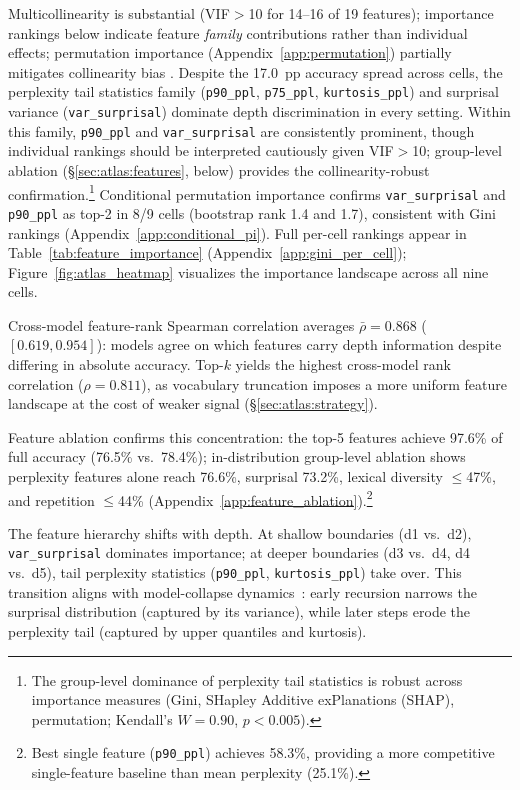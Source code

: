 Multicollinearity is substantial (VIF${>}$10 for 14--16 of 19 features); importance rankings below indicate feature \emph{family} contributions rather than individual effects; permutation importance (Appendix~\ref{app:permutation}) partially mitigates collinearity bias \cite{strobl2008_conditional,hooker2021_permutation}.
Despite the 17.0~pp accuracy spread across cells, the perplexity tail statistics family (\texttt{p90\_ppl}, \texttt{p75\_ppl}, \texttt{kurtosis\_ppl}) and surprisal variance (\texttt{var\_surprisal}) dominate depth discrimination in every setting.
Within this family, \texttt{p90\_ppl} and \texttt{var\_surprisal} are consistently prominent, though individual rankings should be interpreted cautiously given VIF${>}$10; group-level ablation (\S\ref{sec:atlas:features}, below) provides the collinearity-robust confirmation.\footnote{The group-level dominance of perplexity tail statistics is robust across importance measures (Gini, SHapley Additive exPlanations (SHAP), permutation; Kendall's $W{=}0.90$, $p{<}0.005$).}
Conditional permutation importance \citep{strobl2008_conditional} confirms \texttt{var\_surprisal} and \texttt{p90\_ppl} as top-2 in 8/9 cells (bootstrap rank 1.4 and 1.7), consistent with Gini rankings (Appendix~\ref{app:conditional_pi}).
Full per-cell rankings appear in Table~\ref{tab:feature_importance} (Appendix~\ref{app:gini_per_cell}); Figure~\ref{fig:atlas_heatmap} visualizes the importance landscape across all nine cells.

Cross-model feature-rank Spearman correlation averages $\bar{\rho} = 0.868$ ($[0.619, 0.954]$): models agree on which features carry depth information despite differing in absolute accuracy.
Top-$k$ yields the highest cross-model rank correlation ($\rho = 0.811$), as vocabulary truncation imposes a more uniform feature landscape at the cost of weaker signal (\S\ref{sec:atlas:strategy}).

Feature ablation confirms this concentration: the top-5 features achieve 97.6\% of full accuracy (76.5\% vs.\ 78.4\%); in-distribution group-level ablation shows perplexity features alone reach 76.6\%, surprisal 73.2\%, lexical diversity ${\leq}$47\%, and repetition ${\leq}$44\% (Appendix~\ref{app:feature_ablation}).\footnote{Best single feature (\texttt{p90\_ppl}) achieves 58.3\%, providing a more competitive single-feature baseline than mean perplexity (25.1\%).}

The feature hierarchy shifts with depth.
At shallow boundaries (d1 vs.\ d2), \texttt{var\_surprisal} dominates importance; at deeper boundaries (d3 vs.\ d4, d4 vs.\ d5), tail perplexity statistics (\texttt{p90\_ppl}, \texttt{kurtosis\_ppl}) take over.
This transition aligns with model-collapse dynamics~\cite{shumailov2024_nature}: early recursion narrows the surprisal distribution (captured by its variance), while later steps erode the perplexity tail (captured by upper quantiles and kurtosis).



